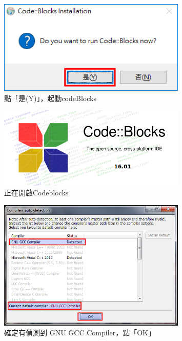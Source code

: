 		\begin{figure}[H]
			\centering
			\includegraphics[width=0.8\textwidth]{fig/install_and_setting/install_009_setup06}
			\caption{點「是(Y)」，起動codeBlocks}
		\end{figure}
		
		\begin{figure}[H]
			\centering
			\includegraphics[width=0.8\textwidth]{fig/install_and_setting/install_010_setup07}
			\caption{正在開啟Codeblocks}
		\end{figure}
		
		\begin{figure}[H]
			\centering
			\includegraphics[width=0.8\textwidth]{fig/install_and_setting/install_011_setup08}
			\caption{確定有偵測到 GNU GCC Compiler，點「OK」}
		\end{figure}
		
